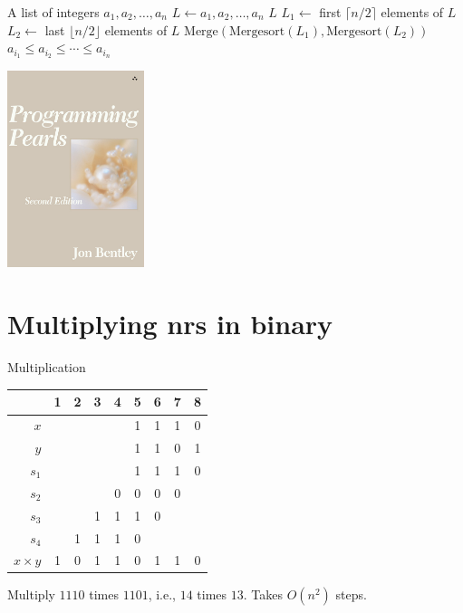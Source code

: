 \begin{frame}
\begin{algorithmic}[1]
\REQUIRE A list of integers $a_1,a_2,\ldots,a_n$
\STATE $L\longleftarrow a_1,a_2,\ldots,a_n$
	\RETURN $L$
\ELSE
	\STATE $L_1\longleftarrow$ first $\lceil n/2\rceil$ elements of $L$
	\STATE $L_2\longleftarrow$ last $\lfloor n/2\rfloor$ elements of $L$
	\RETURN $\text{Merge}(\text{Mergesort}(L_1),\text{Mergesort}(L_2))$
\ENDIF
\ENSURE $a_{i_1}\le a_{i_2}\le\cdots\le a_{i_n}$
\end{algorithmic}
\end{frame}

\begin{frame}
\begin{center}
\includegraphics[width=4cm]{Figures/pearls.png}
\end{center}
\end{frame}

\section{Multiplying nrs in binary}

\begin{frame}
{Multiplication}

\begin{center}
\begin{tabular}{r|cccccccc}
       & 1 & 2 & 3 & 4 & 5 & 6 & 7 & 8    \\\hline
$x$    & &   &   &   & 1 & 1 & 1 & 0       \\
$y$    & &   &   &   & 1 & 1 & 0 & 1       \\\hline
$s_1$  & &   &   &   & 1 & 1 & 1 & 0       \\
$s_2$  & &   &   & 0 & 0 & 0 & 0 &         \\
$s_3$  & &   & 1 & 1 & 1 & 0 &   &         \\
$s_4$  & & 1 & 1 & 1 & 0 &   &   &         \\\hline
$x\times y$ & 1 & 0 & 1 & 1 & 0 & 1 & 1 & 0
\end{tabular}

Multiply $1110$ times $1101$, i.e., $14$ times
$13$.  Takes $O(n^2)$ steps.
\end{center}
\end{frame}

